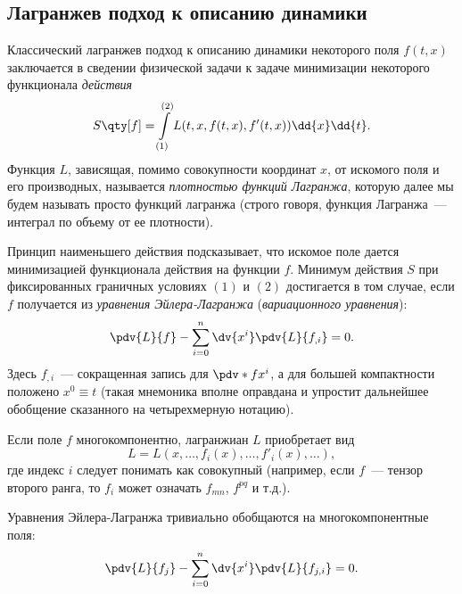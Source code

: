 \documentclass[\docroot/reports/draft/report.tex]{subfiles}
\begin{document}
\onlyinsubfile{\tableofcontents}

\subsection{Лагранжев подход к описанию динамики}

    Классический лагранжев подход к описанию динамики некоторого поля $f(t,x)$ заключается в сведении физической задачи к задаче минимизации некоторого функционала \textit{действия} \cite{landau_v1}
    \begin{equation}
        S\qty[f] = \int\limits_{(1)}^{(2)} L(t, x, f(t,x), f'(t,x)) \dd{x}\dd{t}.
    \end{equation}
    Функция $L$, зависящая, помимо совокупности координат $x$, от искомого поля и его производных, называется \textit{плотностью функций Лагранжа}, которую далее мы будем называть просто функций лагранжа (строго говоря, функция Лагранжа~--- интеграл по объему от ее плотности).

    Принцип наименьшего действия подсказывает, что искомое поле дается минимизацией функционала действия на функции $f$. Минимум действия $S$ при фиксированных граничных условиях $(1)$ и $(2)$ достигается в том случае, если $f$ получается из \textit{уравнения Эйлера-Лагранжа} (\textit{вариационного уравнения}):
    \begin{equation}
        \pdv{L}{f} - \sum\limits_{i=0}^{n} \dv{x^i}\pdv{L}{f_{,i}} = 0 .
    \end{equation}
    Здесь $f_{,i}$~--- сокращенная запись для $\pdv*{f}{x^i}$, а для большей компактности положено $x^0 \equiv t$ (такая мнемоника вполне оправдана и упростит дальнейшее обобщение сказанного на четырехмерную нотацию).

    Если поле $f$ многокомпонентно, лагранжиан $L$ приобретает вид
    \begin{equation}
        L = L(x, \dots, f_i(x), \dots, f'_i(x), \dots),
    \end{equation}
    где индекс $i$ следует понимать как совокупный (например, если $f$~--- тензор второго ранга, то $f_i$ может означать $f_{mn}$, $f^{pq}$ и т.д.).

    Уравнения Эйлера-Лагранжа тривиально обобщаются на многокомпонентные поля:
    \begin{equation}
        \pdv{L}{f_j} - \sum\limits_{i=0}^{n} \dv{x^i}\pdv{L}{f_{j,i}} = 0 .
    \end{equation}
\end{document}
